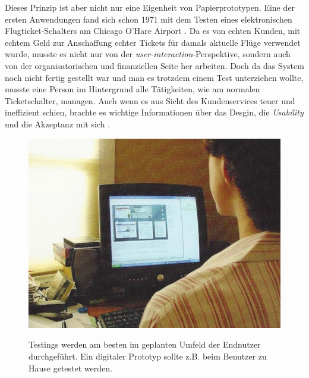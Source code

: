 \medskip Dieses Prinzip ist aber nicht nur eine Eigenheit von Papierprototypen. Eine der ersten Anwendungen fand sich schon 1971 mit dem Testen eines elektronischen Flugticket-Schalters am Chicago O’Hare Airport \citep{Erdmann:1971}. Da es von echten Kunden, mit echtem Geld zur Anschaffung echter Tickets für damals aktuelle Flüge verwendet wurde, musste es nicht nur von der \emph{user-interaction}-Perspektive, sondern auch von der organisatorischen und finanziellen Seite her arbeiten. Doch da das System noch nicht fertig gestellt war und man es trotzdem einem Test unterziehen wollte, musste eine Person im Hintergrund alle Tätigkeiten, wie am normalen Ticketschalter, managen. Auch wenn es aus Sicht des Kundenservices teuer und ineffizient schien, brachte es wichtige Informationen über das Desgin, die \emph{Usability} und die Akzeptanz mit sich \citep{Buxton:2007}.

\begin{figure}
	\begin{center}
        {\includegraphics[width=\linewidth]{gfx/safferUserTesting}}
	\end{center}
		\caption[(User) Testing \newline \citep{Saffer:2007}]{Testings werden am besten im geplanten Umfeld der Endnutzer durchgeführt. Ein digitaler Prototyp sollte z.B. beim Benutzer zu Hause getestet werden.}\label{fig:safferUserTesting}
\end{figure}

